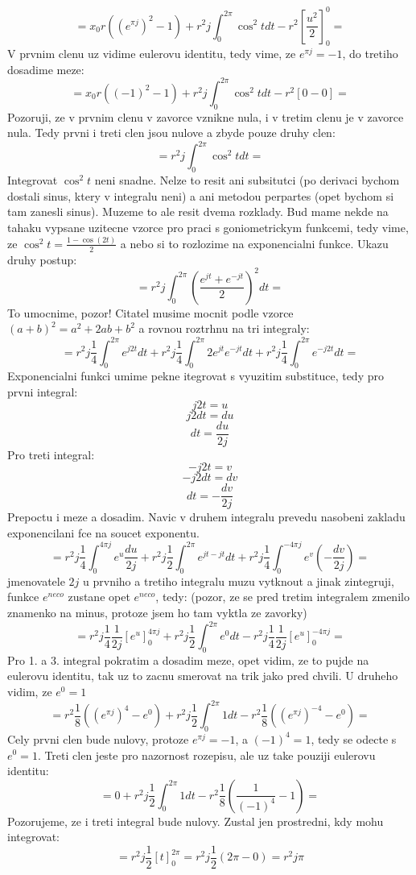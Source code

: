 $$ = x_0 r ( \left(e^{\pi j}\right)^2 - 1) + r^2 j\int_0^{2\pi} \operatorname{cos}^2t dt - r^2 \left[ \frac{u^2}{2}\right]_0^0 = $$
V prvnim clenu uz vidime eulerovu identitu, tedy vime, ze $e^{\pi j} = -1$, do tretiho dosadime meze:
$$ = x_0 r ( (-1)^2 -1 )+ r^2 j\int_0^{2\pi} \operatorname{cos}^2t dt - r^2 \left[ 0 -0\right] = $$
Pozoruji, ze v prvnim clenu v zavorce vznikne nula, i v tretim clenu je v zavorce nula. Tedy prvni i treti clen jsou nulove a zbyde pouze druhy clen:
$$= r^2 j\int_0^{2\pi} \operatorname{cos}^2t dt = $$
Integrovat $\operatorname{cos}^2t $ neni snadne. Nelze to resit ani subsitutci (po derivaci bychom dostali sinus, ktery v integralu neni) a ani metodou perpartes (opet bychom si tam zanesli sinus). Muzeme to ale resit dvema rozklady. Bud mame nekde na tahaku vypsane uzitecne vzorce pro praci s goniometrickym funkcemi, tedy vime, ze $\operatorname{cos}^2t = \frac{1-\operatorname{cos}(2t)}{2}$ a nebo si to rozlozime na exponencialni funkce. Ukazu druhy postup:
$$ = r^2 j \int_0^{2\pi} \left( \frac{e^{jt} + e^{-jt}}{2} \right) ^2 dt = $$
To umocnime, pozor! Citatel musime mocnit podle vzorce $(a+b)^2 = a^2+2ab+b^2$ a rovnou roztrhnu na tri integraly:
$$ = r^2 j \frac{1}{4} \int_0^{2\pi} e^{j2t} dt + r^2 j \frac{1}{4} \int_0^{2\pi} 2e^{jt}e^{-jt} dt + r^2 j \frac{1}{4} \int_0^{2\pi} e^{-j2t} dt =$$
Exponencialni funkci umime pekne itegrovat s vyuzitim substituce, tedy pro prvni integral:
$$j2t = u$$
$$j2 dt = du$$
$$dt = \frac{du}{2j}$$
Pro treti integral:
$$-j2t = v$$
$$-j2 dt = dv$$
$$dt = -\frac{dv}{2j}$$
Prepoctu i meze a dosadim. Navic v druhem integralu prevedu nasobeni zakladu exponencilani fce na soucet exponentu.
$$ =  r^2 j \frac{1}{4} \int_0^{4\pi j} e^u \frac{du}{2j} + r^2 j \frac{1}{2} \int_0^{2\pi} e^{jt-jt} dt +  r^2 j \frac{1}{4} \int_0^{-4\pi j} e^v \left( -\frac{dv}{2j} \right) = $$
jmenovatele $2j$ u prvniho a tretiho integralu muzu vytknout a jinak zintegruji, funkce $e^{neco}$ zustane opet $e^{neco}$, tedy: (pozor, ze se pred tretim integralem zmenilo znamenko na minus, protoze jsem ho tam vyktla ze zavorky)
$$ = r^2 j \frac{1}{4} \frac{1}{2j} \left[ e^u \right]_0^{4\pi j} +  r^2 j \frac{1}{2} \int_0^{2\pi} e^0 dt - r^2 j \frac{1}{4} \frac{1}{2j} \left[ e^u \right]_0^{-4\pi j} = $$
Pro 1. a 3. integral pokratim a dosadim meze, opet vidim, ze to pujde na eulerovu identitu, tak uz to zacnu smerovat na trik jako pred chvili. U druheho vidim, ze $e^0 =1$
$$ = r^2 \frac{1}{8} \left( (e^{\pi j})^4 - e^0 \right) +  r^2 j \frac{1}{2} \int_0^{2\pi} 1 dt - r^2 \frac{1}{8} \left( (e^{\pi j})^{-4} - e^0 \right) =$$
Cely prvni clen bude nulovy, protoze $e^{\pi j} = -1$, a $(-1)^4 = 1$, tedy se odecte s $e^0 = 1$. Treti clen jeste pro nazornost rozepisu, ale uz take pouziji eulerovu identitu:
$$ = 0 +  r^2 j \frac{1}{2} \int_0^{2\pi} 1 dt - r^2 \frac{1}{8} \left( \frac{1}{(-1)^4} - 1 \right)  = $$
Pozorujeme, ze i treti integral bude nulovy. Zustal jen prostredni, kdy mohu integrovat:
$$ = r^2 j \frac{1}{2} \left[ t \right]_0^{2\pi} = r^2 j \frac{1}{2} (2\pi - 0) = r^2 j \pi$$

